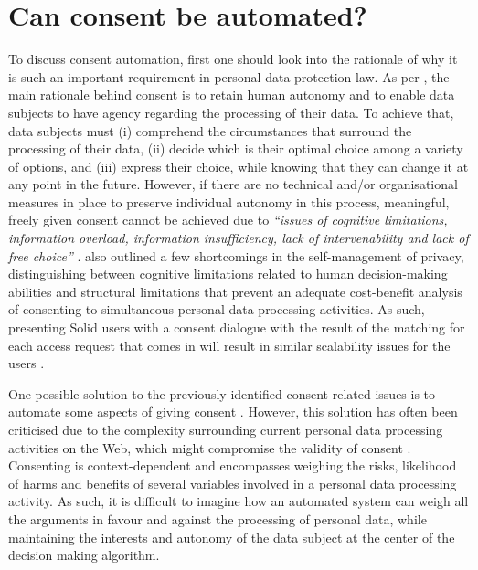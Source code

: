 \section{Can consent be automated?}
\label{sec:automation_consent}

To discuss consent automation, first one should look into the rationale of why it is such an important requirement in personal data protection law.
As per \cite{jarovsky_improving_2018}, the main rationale behind consent is to retain human autonomy and to enable data subjects to have agency regarding the processing of their data.
To achieve that, data subjects must (i) comprehend the circumstances that surround the processing of their data, (ii) decide which is their optimal choice among a variety of options, and (iii) express their choice, while knowing that they can change it at any point in the future.
However, if there are no technical and/or organisational measures in place to preserve individual autonomy in this process, meaningful, freely given consent cannot be achieved due to \textit{``issues of cognitive limitations, information overload, information insufficiency, lack of intervenability and lack of free choice''} \citep{jarovsky_improving_2018}.
\cite{solove_privacy_2012} also outlined a few shortcomings in the self-management of privacy, distinguishing between cognitive limitations related to human decision-making abilities and structural limitations that prevent an adequate cost-benefit analysis of consenting to simultaneous personal data processing activities. 
As such, presenting Solid users with a consent dialogue with the result of the matching for each access request that comes in will result in similar scalability issues for the users \citep{mcdonald_cost_2008}.

One possible solution to the previously identified consent-related issues is to automate some aspects of giving consent \citep{baarslag_automated_2017}.
However, this solution has often been criticised due to the complexity surrounding current personal data processing activities on the Web, which might compromise the validity of consent \citep{jarovsky_improving_2018,solove_murky_2023}.
Consenting is context-dependent and encompasses weighing the risks, likelihood of harms and benefits of several variables involved in a personal data processing activity.
As such, it is difficult to imagine how an automated system can weigh all the arguments in favour and against the processing of personal data, while maintaining the interests and autonomy of the data subject at the center of the decision making algorithm.

